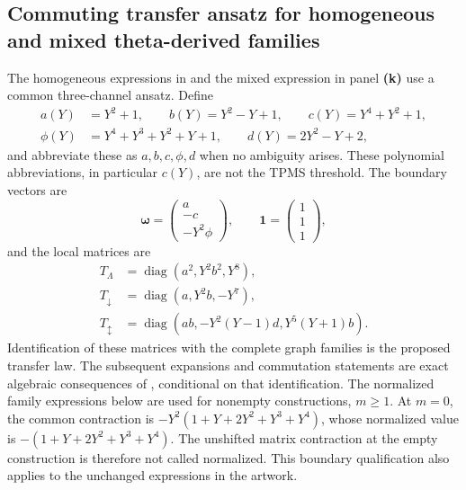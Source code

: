 \documentclass[10pt,twocolumn]{article}
\begin{document}
\subsection{Commuting transfer ansatz for homogeneous and mixed theta-derived families}
\label{supp:transfer_commuting}
\label{supp:transfer_common_notation}
The homogeneous expressions in  and the mixed expression in panel \textbf{(k)} use a common three-channel ansatz. Define
\begin{equation}
\begin{aligned}
a(Y)&=Y^2+1,\qquad b(Y)=Y^2-Y+1,\qquad c(Y)=Y^4+Y^2+1,\\
\phi(Y)&=Y^4+Y^3+Y^2+Y+1,\qquad d(Y)=2Y^2-Y+2,
\end{aligned}
\label{supp:deriv:eq:factors}
\end{equation}
and abbreviate these as $a,b,c,\phi,d$ when no ambiguity arises. These polynomial abbreviations, in particular $c(Y)$, are not the TPMS threshold. The boundary vectors are
\begin{equation}
\bm\omega=\begin{pmatrix}a\\-c\\-Y^2\phi\end{pmatrix},\qquad
\bm 1=\begin{pmatrix}1\\1\\1\end{pmatrix},
\label{supp:deriv:eq:omega}
\end{equation}
and the local matrices are
\begin{equation}
\begin{aligned}
T_\Lambda&=\operatorname{diag}(a^2,Y^2b^2,Y^8),\\
T_\downarrow&=\operatorname{diag}(a,Y^2b,-Y^7),\\
T_\updownarrow&=\operatorname{diag}(ab,-Y^2(Y-1)d,Y^5(Y+1)b).
\end{aligned}
\label{supp:deriv:eq:transfers}
\end{equation}
Identification of these matrices with the complete graph families is the proposed transfer law. The subsequent expansions and commutation statements are exact algebraic consequences of , conditional on that identification. The normalized family expressions below are used for nonempty constructions, $m\geq1$. At $m=0$, the common contraction is $-Y^2(1+Y+2Y^2+Y^3+Y^4)$, whose normalized value is $-(1+Y+2Y^2+Y^3+Y^4)$. The unshifted matrix contraction at the empty construction is therefore not called normalized. This boundary qualification also applies to the unchanged expressions in the artwork.
\end{document}
